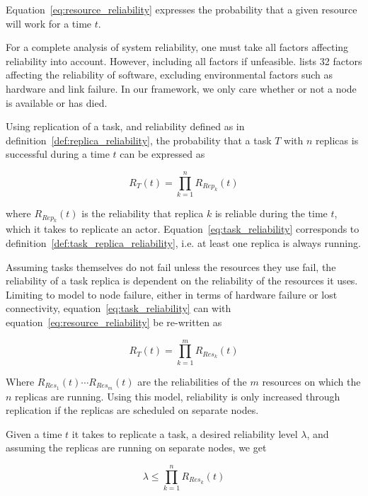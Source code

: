 \documentclass{cslthse-msc}
\begin{document}
Equation~\ref{eq:resource_reliability} expresses the probability that a given resource will work for a time $t$.

For a complete analysis of system reliability, one must take all factors affecting reliability into account. However, including all factors if unfeasible.  \cite{factorsAffectingRel} lists 32 factors affecting the reliability of software, excluding environmental factors such as hardware and link failure. In our framework, we only care whether or not a node is available or has died.


Using replication of a task, and reliability defined as in definition~\ref{def:replica_reliability}, the probability that a task $T$  with $n$ replicas is successful during a time $t$ can be expressed as 

\begin{equation} \label{eq:task_reliability}
R_{T}(t) =  \prod\limits_{k=1}^n R_{Rep_k}(t)
\end{equation}

where $R_{Rep_k}(t)$ is the reliability that replica $k$ is reliable during the time $t$, which it takes to replicate an actor. Equation~\ref{eq:task_reliability} corresponds to definition~\ref{def:task_replica_reliability}, i.e. at least one replica is always running.

Assuming tasks themselves do not fail unless the resources they use fail, the reliability of a task replica is dependent on the reliability of the resources it uses. Limiting to model to node failure, either in terms of hardware failure or lost connectivity, equation~\ref{eq:task_reliability} can with equation~\ref{eq:resource_reliability} be re-written as

\begin{equation} \label{eq:task_reliability_2}
R_{T}(t) = \prod\limits_{k=1}^m  R_{Res_k}(t)
\end{equation}

Where $R_{Res_1}(t) \cdots R_{Res_m}(t)$ are the reliabilities of the $m$ resources on which the $n$ replicas are running. Using this model, reliability is only increased through replication if the replicas are scheduled on separate nodes.

Given a time $t$ it takes to replicate a task, a desired reliability level $\lambda$, and assuming the replicas are running on separate nodes, we get

\begin{equation} \label{eq:desired_rel}
\lambda \leq \prod\limits_{k=1}^n  R_{Res_k}(t)
\end{equation}
\end{document}
